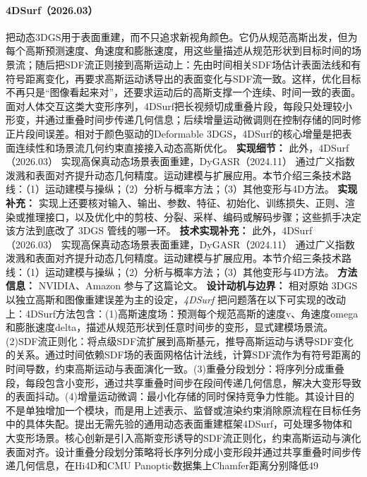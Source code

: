 \paragraph{4DSurf（2026.03）\cite{2603_28064}}
把动态3DGS用于表面重建，而不只追求新视角颜色。它仍从规范高斯出发，但为每个高斯预测速度、角速度和膨胀速度，用这些量描述从规范形状到目标时间的场景流；随后把SDF流正则接到高斯运动上：先由时间相关SDF场估计表面法线和有符号距离变化，再要求高斯运动诱导出的表面变化与SDF流一致。这样，优化目标不再只是“图像看起来对”，还要求运动后的高斯支撑一个连续、时间一致的表面。面对人体交互这类大变形序列，4DSurf把长视频切成重叠片段，每段只处理较小形变，并通过重叠时间步传递几何信息；后续增量运动微调则在控制存储的同时修正片段间误差。相对于颜色驱动的Deformable 3DGS，4DSurf的核心增量是把表面连续性和场景流几何约束直接接入动态高斯优化。
\textbf{实现细节：} 此外，4DSurf（2026.03） 实现高保真动态场景表面重建，DyGASR（2024.11） 通过广义指数泼溅和表面对齐提升动态几何精度。运动建模与扩展应用。本节介绍三条技术路线：（1）运动建模与操纵；（2）分析与概率方法；（3）其他变形与4D方法。
\textbf{实现补充：} 实现上还要核对输入、输出、参数、特征、初始化、训练损失、正则、渲染或推理接口，以及优化中的剪枝、分裂、采样、编码或解码步骤；这些抓手决定该方法到底改了 3DGS 管线的哪一环。
\textbf{技术实现补充：} 此外，4DSurf（2026.03） 实现高保真动态场景表面重建，DyGASR（2024.11） 通过广义指数泼溅和表面对齐提升动态几何精度。运动建模与扩展应用。本节介绍三条技术路线：（1）运动建模与操纵；（2）分析与概率方法；（3）其他变形与4D方法。
\textbf{方法信息：} NVIDIA、Amazon 参与了这篇论文。
\textbf{设计动机与边界：} 相对原始 3DGS 以独立高斯和图像重建误差为主的设定，\textit{4DSurf} 把问题落在以下可实现的改动上：4DSurf方法包含：(1)高斯速度场：预测每个规范高斯的速度v、角速度omega和膨胀速度delta，描述从规范形状到任意时间步的变形，显式建模场景流。(2)SDF流正则化：将点级SDF流扩展到高斯基元，推导高斯运动与诱导SDF变化的关系。通过时间依赖SDF场的表面网格估计法线，计算SDF流作为有符号距离的时间导数，约束高斯运动与表面演化一致。(3)重叠分段划分：将序列分成重叠段，每段包含小变形，通过共享重叠时间步在段间传递几何信息，解决大变形导致的表面抖动。(4)增量运动微调：最小化存储的同时保持竞争力性能。其设计目的不是单独增加一个模块，而是用上述表示、监督或渲染约束消除原流程在目标任务中的具体失配。提出无需先验的通用动态表面重建框架4DSurf，可处理多物体和大变形场景。核心创新是引入高斯变形诱导的SDF流正则化，约束高斯运动与演化表面对齐。设计重叠分段划分策略将长序列分成小变形段并通过共享重叠时间步传递几何信息，在Hi4D和CMU Panoptic数据集上Chamfer距离分别降低49%

